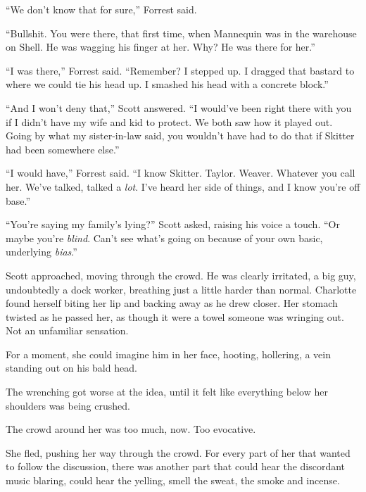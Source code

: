 ``We don't know that for sure,'' Forrest said.



``Bullshit.  You were there, that first time, when Mannequin was in the warehouse on Shell.  He was wagging his finger at her.  Why?  He was there for her.''



``I was there,'' Forrest said.  ``Remember?  I stepped up.  I dragged that bastard to where we could tie his head up.  I smashed his head with a concrete block.''



``And I won't deny that,'' Scott answered.  ``I would've been right there with you if I didn't have my wife and kid to protect.  We both saw how it played out.  Going by what my sister-in-law said, you wouldn't have had to do that if Skitter had been somewhere else.''



``I would have,'' Forrest said.  ``I know Skitter.  Taylor.  Weaver.  Whatever you call her.  We've talked, talked a \emph{lot}.  I've heard her side of things, and I know you're off base.''



``You're saying my family's lying?''  Scott asked, raising his voice a touch.  ``Or maybe you're \emph{blind}.  Can't see what's going on because of your own basic, underlying \emph{bias}.''



Scott approached, moving through the crowd.  He was clearly irritated, a big guy, undoubtedly a dock worker, breathing just a little harder than normal.  Charlotte found herself biting her lip and backing away as he drew closer.  Her stomach twisted as he passed her, as though it were a towel someone was wringing out.  Not an unfamiliar sensation.



For a moment, she could imagine him in her face, hooting, hollering, a vein standing out on his bald head.



The wrenching got worse at the idea, until it felt like everything below her shoulders was being crushed.



The crowd around her was too much, now.  Too evocative.



She fled, pushing her way through the crowd.  For every part of her that wanted to follow the discussion, there was another part that could hear the discordant music blaring, could hear the yelling, smell the sweat, the smoke and incense.



